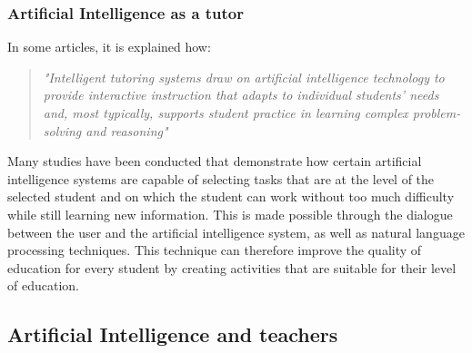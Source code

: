 \documentclass[a4paper,12pt]{article}
\begin{document}
\subsubsection{Artificial Intelligence as a tutor}
In some articles\cite{aleven2009new}, it is explained how: \begin{quote}
\textit{
    "Intelligent tutoring systems draw on artificial intelligence technology to provide interactive instruction that adapts to individual students’ needs and, most typically, supports student practice in learning complex problem-solving and reasoning"}
\end{quote}
Many studies have been conducted that demonstrate how certain artificial intelligence systems are capable of selecting tasks that are at the level of the selected student and on which the student can work without too much difficulty while still learning new information. This is made possible through the dialogue between the user and the artificial intelligence system, as well as natural language processing techniques\cite{rus2013recent}. This technique can therefore improve the quality of education for every student by creating activities that are suitable for their level of education.

\subsection{Artificial Intelligence and teachers}

\newpage    %

\end{document}
